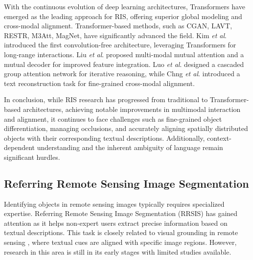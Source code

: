 With the continuous evolution of deep learning architectures, Transformers have emerged as the leading approach for RIS, offering superior global modeling and cross-modal alignment. Transformer-based methods, such as CGAN\cite{luo2020cascade}, LAVT\cite{yang2022lavt}, RESTR\cite{kim2022restr}, M3Att\cite{liu2023multi}, MagNet\cite{chng2024mask}, have significantly advanced the field. Kim \textit{et al}. introduced the first convolution-free architecture, leveraging Transformers for long-range interactions\cite{kim2022restr}. Liu \textit{et al}. proposed multi-modal mutual attention and a mutual decoder for improved feature integration\cite{liu2023multi}. Luo \textit{et al}. designed a cascaded group attention network for iterative reasoning\cite{luo2020cascade}, while Chng \textit{et al}. introduced a text reconstruction task for fine-grained cross-modal alignment\cite{chng2024mask}.

In conclusion, while RIS research has progressed from traditional to Transformer-based architectures, achieving notable improvements in multimodal interaction and alignment, it continues to face challenges such as fine-grained object differentiation, managing occlusions, and accurately aligning spatially distributed objects with their corresponding textual descriptions. Additionally, context-dependent understanding and the inherent ambiguity of language remain significant hurdles.

\subsection{Referring Remote Sensing Image Segmentation}
Identifying objects in remote sensing images typically requires specialized expertise. Referring Remote Sensing Image Segmentation (RRSIS) has gained attention as it helps non-expert users extract precise information based on textual descriptions. This task is closely related to visual grounding in remote sensing \cite{sun2022visual}, where textual cues are aligned with specific image regions. However, research in this area is still in its early stages\cite{yuan2024rrsis,liu2024rotated} with limited studies available. 


